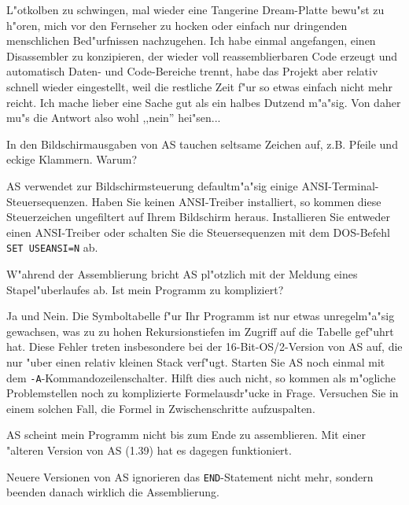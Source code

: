 \documentclass[12pt,a4paper,twoside]{report}
\newcommand{\tty}[1]{{\tt #1}}
\begin{document}
{\begin{description}
{         L"otkolben zu schwingen, mal wieder eine Tangerine Dream-Platte 
         bewu"st zu h"oren, mich vor den Fernseher zu hocken oder einfach
         nur dringenden menschlichen Bed"urfnissen nachzugehen.  Ich habe
         einmal angefangen, einen Disassembler zu konzipieren, der wieder
         voll reassemblierbaren Code erzeugt und automatisch Daten- und
         Code-Bereiche trennt, habe das Projekt aber relativ schnell wieder
         eingestellt, weil die restliche Zeit f"ur so etwas einfach nicht
         mehr reicht.  Ich mache lieber eine Sache gut als ein halbes
         Dutzend m"a"sig.  Von daher mu"s die Antwort also wohl ,,nein''
         hei"sen...}
\vspace{0.3cm}
\item[F:]{In den Bildschirmausgaben von AS tauchen seltsame Zeichen auf,
          z.B. Pfeile und eckige Klammern.  Warum?}
\item[A:]{AS verwendet zur Bildschirmsteuerung defaultm"a"sig einige
          ANSI-Terminal-Steuersequenzen.  Haben Sie keinen ANSI-Treiber
	  installiert, so kommen diese Steuerzeichen ungefiltert auf
	  Ihrem Bildschirm heraus.  Installieren Sie entweder einen
	  ANSI-Treiber oder schalten Sie die Steuersequenzen mit dem
	  DOS-Befehl \tty{SET USEANSI=N} ab.}
\vspace{0.3cm}
\item[F:]{W"ahrend der Assemblierung bricht AS pl"otzlich mit der
          Meldung eines Stapel"uberlaufes ab.  Ist mein Programm zu
	  kompliziert?}
\item[A:]{Ja und Nein.  Die Symboltabelle f"ur Ihr Programm ist nur
          etwas unregelm"a"sig gewachsen, was zu zu hohen Rekursionstiefen
	  im Zugriff auf die Tabelle gef"uhrt hat.  Diese Fehler treten
	  insbesondere bei der 16-Bit-OS/2-Version von AS auf, die nur
	  "uber einen relativ kleinen Stack verf"ugt.  Starten Sie AS noch
	  einmal mit dem \tty{-A}-Kommandozeilenschalter.  Hilft dies auch
          nicht, so kommen als m"ogliche Problemstellen noch zu komplizierte
          Formelausdr"ucke in Frage.  Versuchen Sie in einem solchen Fall,
          die Formel in Zwischenschritte aufzuspalten.}
\vspace{0.3cm}
\item[F:]{AS scheint mein Programm nicht bis zum Ende zu assemblieren.
          Mit einer "alteren Version von AS (1.39) hat es dagegen
	  funktioniert.}
\item[A:]{Neuere Versionen von AS ignorieren das \tty{END}-Statement nicht
          mehr, sondern beenden danach wirklich die Assemblierung.
}
\end{description}}
\end{document}
